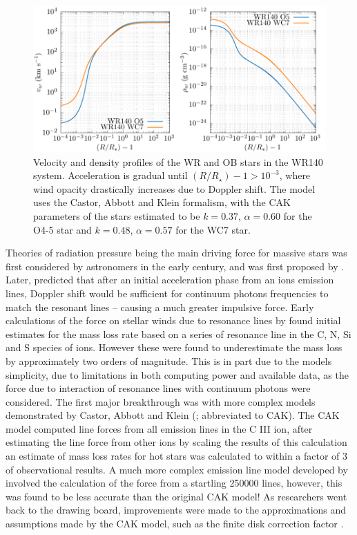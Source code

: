\begin{figure}[h]
  \centering
  \includegraphics[]{assets/cak/vel.pdf}
  \caption[Radiative line driving velocity and density profile]{Velocity and density profiles of the WR and OB stars in the WR140 system. Acceleration is gradual until $(R/R_\star) - 1 > 10^{-3}$, where wind opacity drastically increases due to Doppler shift. The model uses the Castor, Abbott and Klein formalism, with the CAK parameters of the stars estimated to be $k = 0.37$, $\alpha = 0.60$ for the O4-5 star and $k = 0.48$, $\alpha = 0.57$ for the WC7 star.}
  \label{fig:cak-vel}
\end{figure}

Theories of radiation pressure being the main driving force for massive stars was first considered by astronomers in the early  century, and was first proposed by \textcite{sahaRadiationPressureQuantumTheory1919}.
Later, \textcite{milnePossibilityEmissionHighspeed1926} predicted that after an initial acceleration phase from an ions emission lines, Doppler shift would be sufficient for continuum photons frequencies to match the resonant lines -- causing a much greater impulsive force.
Early calculations of the force on stellar winds due to resonance lines by \textcite{lucy_mass_1970} found initial estimates for the mass loss rate based on a series of resonance line in the C, N, Si and S species of ions.
However these were found to underestimate the mass loss by approximately two orders of magnitude.
This is in part due to the models simplicity, due to limitations in both computing power and available data, as the force due to interaction of resonance lines with continuum photons were considered.
The first major breakthrough was with more complex models demonstrated by Castor, Abbott and Klein (\citeyear{castor_radiation-driven_1975}; abbreviated to CAK).
The CAK model computed line forces from all emission lines in the C III ion, after estimating the line force from other ions by scaling the results of this calculation an estimate of mass loss rates for hot stars was calculated to within a factor of 3 of observational results.
A much more complex emission line model developed by \textcite{1982ApJ...259..282A} involved the calculation of the force from a startling \num{250000} lines, however, this was found to be less accurate than the original CAK model!
As researchers went back to the drawing board, improvements were made to the approximations and assumptions made by the CAK model, such as the finite disk correction factor
\parencite{friend_theory_1986,pauldrachRadiationdrivenWindsHot1986}.

